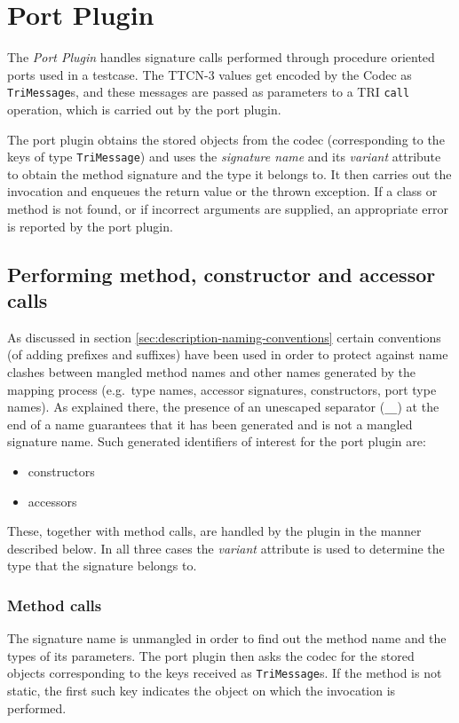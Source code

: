 \section{Port Plugin}

The \emph{Port Plugin} handles signature calls
performed through procedure oriented ports used in a testcase.
The \ac{TTCN-3} values get encoded by the Codec as \verb=TriMessage=s,
and these messages are passed as parameters
to a \ac{TRI} \verb=call= operation, which is carried out by the port plugin.

The port plugin obtains the stored objects from the codec
(corresponding to the keys of type \verb=TriMessage=)
and uses the \emph{signature name} and its \emph{variant} attribute
to obtain the method signature and the type it belongs to.
It then carries out the invocation
and enqueues the return value or the thrown exception.
If a class or method is not found, or if incorrect arguments are supplied,
an appropriate error is reported by the port plugin.


\subsection{Performing method, constructor and accessor calls}

As discussed in section \ref{sec:description-naming-conventions}
certain conventions (of adding prefixes and suffixes) have been used
in order to protect against name clashes between
mangled method names and other names generated by the mapping process
(e.g.\ type names, accessor signatures, constructors, port type names).
As explained there, the presence of an unescaped separator (\verb=__=)
at the end of a name guarantees that it has been generated
and is not a mangled signature name.
Such generated identifiers of interest for the port plugin are:
\begin{itemize}
\item constructors
\item accessors
\end{itemize}
These, together with method calls, are handled by the plugin
in the manner described below.
In all three cases the \emph{variant} attribute
is used to determine the type that the signature belongs to.


\subsubsection{Method calls}

The signature name is unmangled in order to find out
the method name and the types of its parameters.
The port plugin then asks the codec for the stored objects
corresponding to the keys received as \verb=TriMessage=s.
If the method is not static,
the first such key indicates the object on which the invocation is performed.

